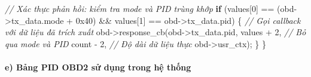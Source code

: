 \documentclass[a4paper]{extarticle}
\newenvironment{Shaded}{}{}
\newcommand{\BaseNTok}[1]{\textcolor[rgb]{0.25,0.63,0.44}{#1}}
\newcommand{\CommentTok}[1]{\textcolor[rgb]{0.38,0.63,0.69}{\textit{#1}}}
\newcommand{\ControlFlowTok}[1]{\textcolor[rgb]{0.00,0.44,0.13}{\textbf{#1}}}
\newcommand{\DecValTok}[1]{\textcolor[rgb]{0.25,0.63,0.44}{#1}}
\newcommand{\NormalTok}[1]{#1}
\newcommand{\OperatorTok}[1]{\textcolor[rgb]{0.40,0.40,0.40}{#1}}
\begin{document}
\begin{Shaded}
\begin{Highlighting}[]
    \CommentTok{// Xác thực phản hồi: kiểm tra mode và PID trùng khớp}
    \ControlFlowTok{if} \OperatorTok{(}\NormalTok{values}\OperatorTok{[}\DecValTok{0}\OperatorTok{]} \OperatorTok{==} \OperatorTok{(}\NormalTok{obd}\OperatorTok{{-}\textgreater{}}\NormalTok{tx\_data}\OperatorTok{.}\NormalTok{mode }\OperatorTok{+} \BaseNTok{0x40}\OperatorTok{)} \OperatorTok{\&\&}
\NormalTok{        values}\OperatorTok{[}\DecValTok{1}\OperatorTok{]} \OperatorTok{==}\NormalTok{ obd}\OperatorTok{{-}\textgreater{}}\NormalTok{tx\_data}\OperatorTok{.}\NormalTok{pid}\OperatorTok{)} \OperatorTok{\{}
        \CommentTok{// Gọi callback với dữ liệu đã trích xuất}
\NormalTok{        obd}\OperatorTok{{-}\textgreater{}}\NormalTok{response\_cb}\OperatorTok{(}\NormalTok{obd}\OperatorTok{{-}\textgreater{}}\NormalTok{tx\_data}\OperatorTok{.}\NormalTok{pid}\OperatorTok{,}
\NormalTok{                         values }\OperatorTok{+} \DecValTok{2}\OperatorTok{,}      \CommentTok{// Bỏ qua mode và PID}
\NormalTok{                         count }\OperatorTok{{-}} \DecValTok{2}\OperatorTok{,}       \CommentTok{// Độ dài dữ liệu thực}
\NormalTok{                         obd}\OperatorTok{{-}\textgreater{}}\NormalTok{usr\_ctx}\OperatorTok{);}
    \OperatorTok{\}}
\OperatorTok{\}}
\end{Highlighting}
\end{Shaded}

\paragraph{e) Bảng PID OBD2 sử dụng trong hệ
thống}\label{e-bux1ea3ng-pid-obd2-sux1eed-dux1ee5ng-trong-hux1ec7-thux1ed1ng}
\end{document}
